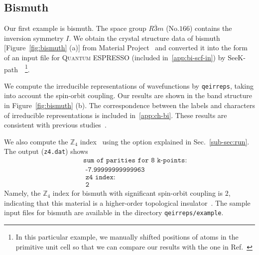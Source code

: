 \documentclass[3p,preprint]{elsarticle}
\newcommand{\mZ}{\mathbb{Z}}
\begin{document}
\subsection{Bismuth}\label{sub-sec:ex-bi}
Our first example is bismuth. The space group ${R\bar{3}m}$ (No.$166$) contains the inversion symmetry $I$. 
We obtain the crystal structure data of bismuth [Figure~\ref{fig:bismuth} (a)] from Material Project~\cite{mp} and converted it into the form of an input file for \textsc{Quantum ESPRESSO} (included in~\ref{app:bi-scf-in}) by SeeK-path~\cite{seekpath1,seekpath2}~\footnote{In this particular example, we manually shifted positions of atoms in the primitive unit cell so that we can compare our results with the one in Ref.~\cite{Vergniory2019}}. %

We compute the irreducible representations of wavefunctions by \texttt{qeirreps}, taking into account the spin-orbit coupling.
Our results are shown in the band structure in Figure~\ref{fig:bismuth} (b).
The correspondence between the labels and characters of irreducible representations is included in~\ref{app:ch-bi}. 
These results are consistent with previous studies~\cite{Vergniory2019,Bilbao}. 

We also compute the $\mZ_4$ index~\cite{PhysRevX.8.031070, QuantitativeMappings} using the option explained in Sec.~\ref{sub-sec:run}. The output (\texttt{z4.dat}) shows
\begin{eqnarray*}
	&&\texttt{sum of parities for           8 k-points:}\\
	&&\texttt{  -7.99999999999963}\\
	&&\texttt{ z4 index:}\\
	&&\texttt{ 2}
\end{eqnarray*}
Namely, the $\mZ_4$ index for bismuth with  significant spin-orbit coupling is $2$, indicating that this material is a higher-order topological insulator~\cite{Schindler:2018aa,Tang2019,Vergniory2019,Hsu13255}. The sample input files for bismuth are available in the directory \texttt{qeirreps/example}. 


\end{document}
